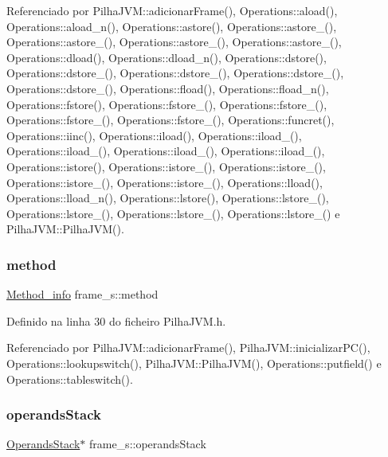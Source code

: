 Referenciado por Pilha\+J\+V\+M\+::adicionar\+Frame(), Operations\+::aload(), Operations\+::aload\+\_\+n(), Operations\+::astore(), Operations\+::astore\+\_(), Operations\+::astore\+\_(), Operations\+::astore\+\_(), Operations\+::astore\+\_(), Operations\+::dload(), Operations\+::dload\+\_\+n(), Operations\+::dstore(), Operations\+::dstore\+\_(), Operations\+::dstore\+\_(), Operations\+::dstore\+\_(), Operations\+::dstore\+\_(), Operations\+::fload(), Operations\+::fload\+\_\+n(), Operations\+::fstore(), Operations\+::fstore\+\_(), Operations\+::fstore\+\_(), Operations\+::fstore\+\_(), Operations\+::fstore\+\_(), Operations\+::funcret(), Operations\+::iinc(), Operations\+::iload(), Operations\+::iload\+\_(), Operations\+::iload\+\_(), Operations\+::iload\+\_(), Operations\+::iload\+\_(), Operations\+::istore(), Operations\+::istore\+\_(), Operations\+::istore\+\_(), Operations\+::istore\+\_(), Operations\+::istore\+\_(), Operations\+::lload(), Operations\+::lload\+\_\+n(), Operations\+::lstore(), Operations\+::lstore\+\_(), Operations\+::lstore\+\_(), Operations\+::lstore\+\_(), Operations\+::lstore\+\_() e Pilha\+J\+V\+M\+::\+Pilha\+J\+V\+M().

\mbox{\label{structframe__s_a9449132746fe7f38ff9048503b59065f}} 
\subsubsection{\texorpdfstring{method}{method}}
{\footnotesize\ttfamily \hyperlink{structMethod__info}{Method\+\_\+info} frame\+\_\+s\+::method}



Definido na linha 30 do ficheiro Pilha\+J\+V\+M.\+h.



Referenciado por Pilha\+J\+V\+M\+::adicionar\+Frame(), Pilha\+J\+V\+M\+::inicializar\+P\+C(), Operations\+::lookupswitch(), Pilha\+J\+V\+M\+::\+Pilha\+J\+V\+M(), Operations\+::putfield() e Operations\+::tableswitch().

\mbox{\label{structframe__s_ac26720ef0e7627d29c868eba6a15bfc1}} 
\subsubsection{\texorpdfstring{operands\+Stack}{operandsStack}}
{\footnotesize\ttfamily \hyperlink{classOperandsStack}{Operands\+Stack}$\ast$ frame\+\_\+s\+::operands\+Stack}



